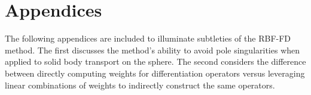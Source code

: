 \documentclass[11pt]{report}
\begin{document}
\part{Appendices}
The following appendices are included to illuminate subtleties of the RBF-FD method. The first discusses the method's ability to avoid pole singularities when applied to solid body transport on the sphere. The second considers the difference between directly computing weights for differentiation operators versus leveraging linear combinations of weights to indirectly construct the same operators. 
\appendix



\ifstandalone


\end{document}
